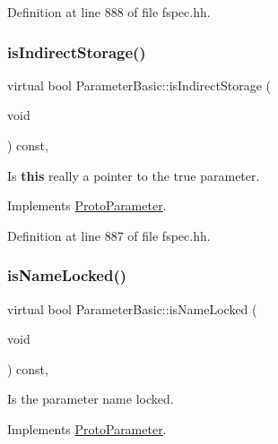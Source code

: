 Definition at line 888 of file fspec.\+hh.

\mbox{\label{class_parameter_basic_a9f09a6b3c75b4a3161b789fda98edc4a}} 
\subsubsection{\texorpdfstring{isIndirectStorage()}{isIndirectStorage()}}
{\footnotesize\ttfamily virtual bool Parameter\+Basic\+::is\+Indirect\+Storage (\begin{DoxyParamCaption}\item[{void}]{ }\end{DoxyParamCaption}) const\hspace{0.3cm}{\ttfamily [inline]}, {\ttfamily [virtual]}}



Is {\bfseries{this}} really a pointer to the true parameter. 



Implements \mbox{\hyperlink{class_proto_parameter_a07008f520e34c236298de7f652c22657}{Proto\+Parameter}}.



Definition at line 887 of file fspec.\+hh.

\mbox{\label{class_parameter_basic_a5356f1c78cedff7576c3cd5d04c3ae91}} 
\subsubsection{\texorpdfstring{isNameLocked()}{isNameLocked()}}
{\footnotesize\ttfamily virtual bool Parameter\+Basic\+::is\+Name\+Locked (\begin{DoxyParamCaption}\item[{void}]{ }\end{DoxyParamCaption}) const\hspace{0.3cm}{\ttfamily [inline]}, {\ttfamily [virtual]}}



Is the parameter name locked. 



Implements \mbox{\hyperlink{class_proto_parameter_ae8d61607d66c96ac0fc9e0e6b7a100f1}{Proto\+Parameter}}.



